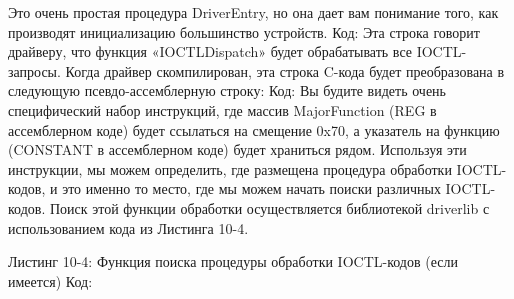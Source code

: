 \documentclass[12pt]{book}
\begin{document}







Это очень простая процедура DriverEntry, но она дает вам понимание того, как производят инициализацию большинство устройств. 
Код:
Эта строка говорит драйверу, что функция «IOCTLDispatch» будет обрабатывать все IOCTL-запросы. Когда драйвер скомпилирован, эта строка C-кода будет преобразована в следующую псевдо-ассемблерную строку: 
Код:
Вы будите видеть очень специфический набор инструкций, где массив MajorFunction (REG в ассемблерном коде) будет ссылаться на смещение 0x70, а указатель на функцию (CONSTANT в ассемблерном коде) будет храниться рядом. Используя эти инструкции, мы можем определить, где размещена процедура обработки IOCTL-кодов, и это именно то место, где мы можем начать поиски различных IOCTL-кодов. Поиск этой функции обработки осуществляется библиотекой driverlib с использованием кода из Листинга 10-4. 

Листинг 10-4: Функция поиска процедуры обработки IOCTL-кодов (если имеется)
Код:




\end{document}
